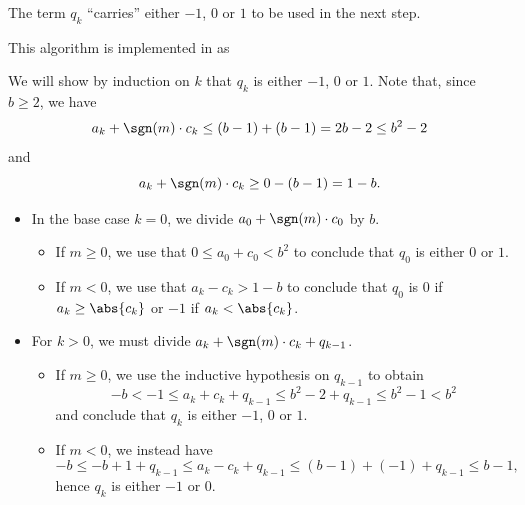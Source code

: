 \begin{comments}
  \item The term \( q_k \) \enquote{carries} either \( -1 \), \( 0 \) or \( 1 \) to be used in the next step.
  \item This algorithm is implemented in \cite{notebook:code} as
  \begin{CodeRefDisplay}
  \end{CodeRefDisplay}
\end{comments}
\begin{defproof}
   We will show by induction on \( k \) that \( q_k \) is either \( -1 \), \( 0 \) or \( 1 \). Note that, since \( b \geq 2 \), we have
  \begin{equation*}
    a_k + \sgn(m) \cdot c_k \leq (b - 1) + (b - 1) = 2b - 2 \leq b^2 - 2
  \end{equation*}
  and
  \begin{equation*}
    a_k + \sgn(m) \cdot c_k \geq 0 - (b - 1) = 1 - b.
  \end{equation*}

  \begin{itemize}
    \item In the base case \( k = 0 \), we divide \( a_0 + \sgn(m) \cdot c_0 \) by \( b \).
    \begin{itemize}
      \item If \( m \geq 0 \), we use that \( 0 \leq a_0 + c_0 < b^2 \) to conclude that \( q_0 \) is either \( 0 \) or \( 1 \).
      \item If \( m < 0 \), we use that \( a_k - c_k > 1 - b \) to conclude that \( q_0 \) is \( 0 \) if \( a_k \geq \abs{c_k} \) or \( -1 \) if \( a_k < \abs{c_k} \).
    \end{itemize}

    \item For \( k > 0 \), we must divide \( a_k + \sgn(m) \cdot c_k + q_{k-1} \).
    \begin{itemize}
      \item If \( m \geq 0 \), we use the inductive hypothesis on \( q_{k-1} \) to obtain
      \begin{equation*}
        -b < -1 \leq a_k + c_k + q_{k-1} \leq b^2 - 2 + q_{k-1} \leq b^2 - 1 < b^2
      \end{equation*}
      and conclude that \( q_k \) is either \( -1 \), \( 0 \) or \( 1 \).

      \item If \( m < 0 \), we instead have
      \begin{equation*}
        -b \leq -b + 1 + q_{k-1} \leq a_k - c_k + q_{k-1} \leq (b - 1) + (-1) + q_{k-1} \leq b - 1,
      \end{equation*}
      hence \( q_k \) is either \( -1 \) or \( 0 \).
    \end{itemize}
  \end{itemize}


\end{defproof}
